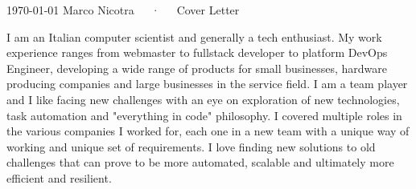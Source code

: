 \documentclass[11pt, a4paper]{awesome-cv}
\begin{document}
\makecvheader[R]

\makecvfooter
  {\today}
  {Marco Nicotra~~~·~~~Cover Letter}
  {}

\makelettertitle

\begin{cvletter}

I am an Italian computer scientist and generally a tech enthusiast. My work experience ranges from webmaster to fullstack developer to platform DevOps Engineer, developing a wide range of products for small businesses, hardware producing companies and large businesses in the service field. I am a team player and I like facing new challenges with an eye on exploration of new technologies, task automation and "everything in code" philosophy. I covered multiple roles in the various companies I worked for, each one in a new team with a unique way of working and unique set of requirements. I love finding new solutions to old challenges that can prove to be more automated, scalable and ultimately more efficient and resilient.


\end{cvletter}
\end{document}
